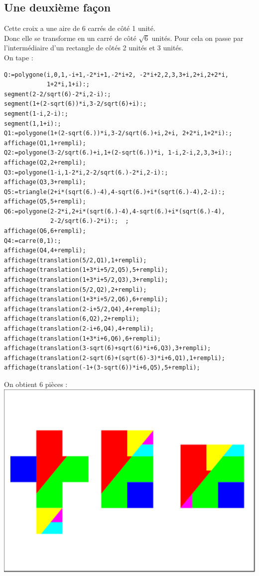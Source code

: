 \documentclass[a4paper,11pt]{book}
\begin{document}
\subsection{Une deuxi\`eme fa\c{c}on}
Cette croix a une aire de 6 carr\'es de c\^ot\'e 1 unit\'e.\\
Donc elle se transforme en un carr\'e de c\^ot\'e $\sqrt 6$ unit\'es.
Pour cela on passe par l'interm\'ediaire d'un rectangle de c\^ot\'es  2 unit\'es
et 3 unit\'es.\\
On tape :
\begin{verbatim}
Q:=polygone(i,0,1,-i+1,-2*i+1,-2*i+2, -2*i+2,2,3,3+i,2+i,2+2*i,
            1+2*i,1+i):;
segment(2-2/sqrt(6)-2*i,2-i):;
segment(1+(2-sqrt(6))*i,3-2/sqrt(6)+i):;
segment(1-i,2-i):;
segment(1,1+i):;
Q1:=polygone(1+(2-sqrt(6.))*i,3-2/sqrt(6.)+i,2+i, 2+2*i,1+2*i):;
affichage(Q1,1+rempli);
Q2:=polygone(3-2/sqrt(6.)+i,1+(2-sqrt(6.))*i, 1-i,2-i,2,3,3+i):;
affichage(Q2,2+rempli);
Q3:=polygone(1-i,1-2*i,2-2/sqrt(6.)-2*i,2-i):;
affichage(Q3,3+rempli);
Q5:=triangle(2+i*(sqrt(6.)-4),4-sqrt(6.)+i*(sqrt(6.)-4),2-i):;
affichage(Q5,5+rempli);
Q6:=polygone(2-2*i,2+i*(sqrt(6.)-4),4-sqrt(6.)+i*(sqrt(6.)-4),
             2-2/sqrt(6.)-2*i):;  ;
affichage(Q6,6+rempli);
Q4:=carre(0,1):;
affichage(Q4,4+rempli);
affichage(translation(5/2,Q1),1+rempli);
affichage(translation(1+3*i+5/2,Q5),5+rempli);
affichage(translation(1+3*i+5/2,Q3),3+rempli);
affichage(translation(5/2,Q2),2+rempli);
affichage(translation(1+3*i+5/2,Q6),6+rempli);
affichage(translation(2-i+5/2,Q4),4+rempli);
affichage(translation(6,Q2),2+rempli);
affichage(translation(2-i+6,Q4),4+rempli);
affichage(translation(1+3*i+6,Q6),6+rempli);
affichage(translation(3-sqrt(6)+sqrt(6)*i+6,Q3),3+rempli);
affichage(translation(2-sqrt(6)+(sqrt(6)-3)*i+6,Q1),1+rempli);
affichage(translation(-1+(3-sqrt(6))*i+6,Q5),5+rempli);
\end{verbatim}
On obtient 6 pi\`eces :\\
\includegraphics[width=\textwidth]{pusslecroix9}
\end{document}
